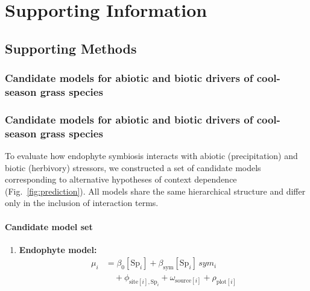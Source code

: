\documentclass[12pt]{article}\usepackage[]{graphicx}\usepackage[dvipsnames]{xcolor}
\begin{document}
{\begin{table}[h]
\begin{tabular}{llrr}
\bottomrule
\end{tabular}
\end{table}
\clearpage
\appendix

\setcounter{figure}{0}
\setcounter{table}{0}
\setcounter{equation}{0}
\setcounter{section}{0}

\renewcommand{\thesection}{S.\arabic{section}}

\renewcommand{\theequation}{S\arabic{equation}}

\renewcommand{\figurename}{Fig}
\renewcommand{\thefigure}{S\arabic{figure}}

\renewcommand{\thetable}{S\arabic{table}}
\renewcommand{\tablename}{Table}

\section*{Supporting Information}

\subsection*{Supporting Methods}
\subsubsection*{Candidate models for abiotic and biotic drivers of
cool-season grass species}
\label{sec:models}
\subsubsection*{Candidate models for abiotic and biotic drivers of cool-season grass species}
\label{sec:models}

To evaluate how endophyte symbiosis interacts with abiotic (precipitation) and biotic (herbivory) stressors, we constructed a set of candidate models corresponding to alternative hypotheses of context dependence (Fig.~\ref{fig:prediction}). All models share the same hierarchical structure and differ only in the inclusion of interaction terms.

\paragraph{Candidate model set}

\begin{enumerate}
    \item \textbf{Endophyte model:}
    \begin{align*}
    \mu_i &= \beta_0[\text{Sp}_i] + \beta_{\text{sym}}[\text{Sp}_i]\,sym_i \\
    &\quad + \phi_{\text{site}[i],\text{Sp}_i} + \omega_{\text{source}[i]} + \rho_{\text{plot}[i]}
    \end{align*}


\end{enumerate}}
\end{document}
